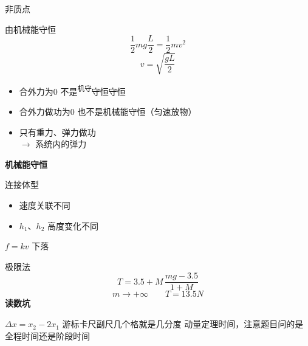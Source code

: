 
非质点

由机械能守恒
\[
\frac12 mg\frac L2=\frac12 mv^2
\]
\[
v=\sqrt{\frac{gL}{2}}
\]
\begin{itemize}
\item 合外力为0 不是\textsuperscript{机守}守恒守恒 %
\item 合外力做功为0 也不是机械能守恒\quad（匀速放物） %
\item 只有重力、弹力做功\\
  $\to$ 系统内的弹力
\end{itemize}
\textbf{机械能守恒}

连接体型
\begin{itemize}
\item 速度关联不同
\item $h_1$、$h_2$ 高度变化不同
\end{itemize}
$f=kv$ 下落


极限法
\[
T=3.5+M\,\frac{mg-3.5}{1+M}
\]%
\[
m\to+\infty\qquad T=13.5\unit{N}
\]
\textbf{读数坑}


$\Delta x=x_2-2x_1$
游标卡尺副尺几个格就是几分度 %
动量定理时间，注意题目问的是全程时间还是阶段时间 %

